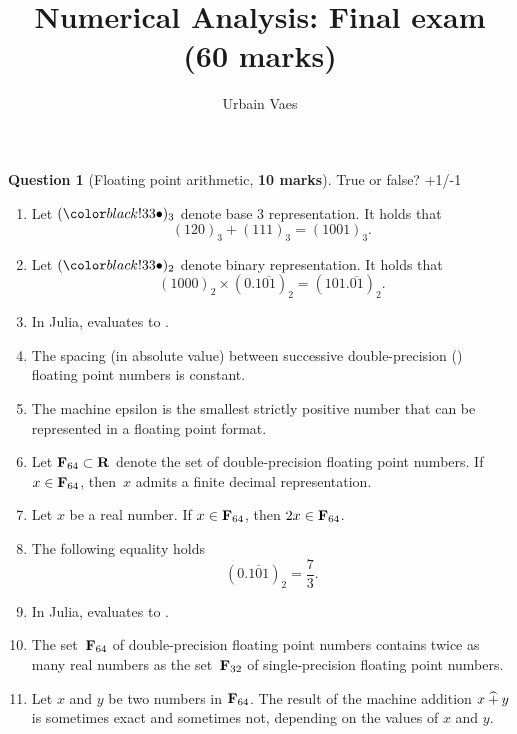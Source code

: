 \documentclass[11pt]{article}
\theoremstyle{definition}
\newtheorem{question}{Question}
\begin{document}
\title{Numerical Analysis: Final exam (60 marks)}
\author{Urbain Vaes}
\maketitle

\begin{question}
    [Floating point arithmetic, \textbf{10 marks}]
    True or false? +1/-1
    \begin{enumerate}
        \item
            Let $(\placeholder)_3$ denote base 3 representation.
            It holds that
            \[
                (120)_3 + (111)_3 = (1001)_3.
            \]
        \item
            Let $(\placeholder)_2$ denote binary representation.
            It holds that
            \[
                (1000)_2 \times (0.1\overline{01})_2 = (101.\overline{01})_2.
            \]

        \item In Julia,  evaluates to .

        \item The spacing (in absolute value) between successive double-precision () floating point numbers is constant.

        \item
            The machine epsilon is the smallest strictly positive number that can be represented in a floating point format.

        \item
            Let $\mathbf F_{64} \subset \mathbf R$ denote the set of double-precision floating point numbers.
            If $x \in \mathbf F_{64}$, then~$x$ admits a finite decimal representation.

        \item
            Let $x$ be a real number. If $x \in \mathbf F_{64}$, then $2x \in \mathbf F_{64}$.

        \item
            The following equality holds
            \[
                (0.\overline{101})_2 = \frac{7}{3}.
            \]

        \item
            In Julia,  evaluates to .

        \item
            The set~$\mathbf F_{64}$ of double-precision floating point numbers contains twice as many real numbers
            as the set~$\mathbf F_{32}$ of single-precision floating point numbers.

        \item
            Let $x$ and $y$ be two numbers in $\mathbf F_{64}$.
            The result of the machine addition $x \mathbin{\widehat +} y$ is sometimes exact and sometimes not,
            depending on the values of $x$ and $y$.
    \end{enumerate}
\end{question}
\end{document}

